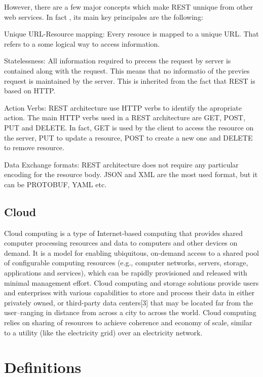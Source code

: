 However, there are a few major concepts which make REST unnique from other web
services. In fact , its main key principales are the following:

Unique URL-Resource mapping: Every resouce is mapped to a unique URL. That
refers to a some logical way  to access information. 

Statelessness: All information required to precess the request by server is
contained along with the request. This means that no informatio of the previes
request is maintained by the server. This is inherited from the fact that REST
is based on HTTP.

Action Verbs: REST architecture use HTTP verbs to identify the apropriate
action. The main HTTP verbs used in a REST architecture are GET, POST, PUT and
DELETE. In fact, GET is used by the client to access the resource on the server,
PUT to update a resource, POST to create a new one and DELETE to remove
resource.

Data Exchange formats: REST architecture does not require any particular
encoding for the resource body. JSON and XML are the most used format, but it
can be PROTOBUF, YAML etc. 

\subsection{Cloud}

Cloud computing is a type of Internet-based computing that provides shared
computer processing resources and data to computers and other devices on demand.
It is a model for enabling ubiquitous, on-demand access to a shared pool of
configurable computing resources (e.g., computer networks, servers, storage,
applications and services), which can be rapidly provisioned and released
with minimal management effort. Cloud computing and storage solutions provide
users and enterprises with various capabilities to store and process their data
in either privately owned, or third-party data centers[3] that may be located
far from the user–ranging in distance from across a city to across the world.
Cloud computing relies on sharing of resources to achieve coherence and economy
of scale, similar to a utility (like the electricity grid) over an electricity
network.

\section{Definitions}

